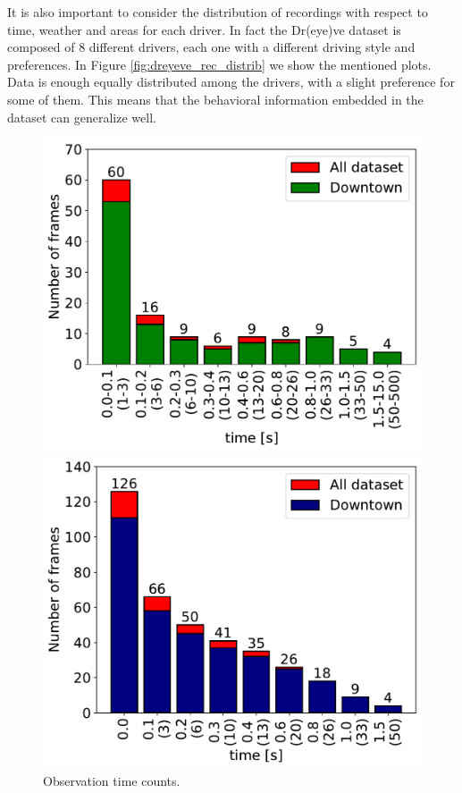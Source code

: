 It is also important to consider the distribution of recordings with respect to 
time, weather and areas for each driver. In fact the Dr(eye)ve dataset is 
composed of 8 different drivers, each one with a different driving style and 
preferences. In Figure \ref{fig:dreyeve_rec_distrib} we 
show the mentioned plots. Data is enough equally distributed among the drivers, 
with a slight preference for some of them. This means that the behavioral 
information embedded in the dataset can generalize well.

\begin{figure}
    \centering
    \begin{minipage}{0.49\textwidth}
        \centering
        \includegraphics[width=\textwidth]{images/dreyeve/tracking_distrib.pdf}
        \caption[Observation time counts.]
        {Observation time counts.}
        \label{fig:tracking_distribution}
    \end{minipage}\hfill
    \begin{minipage}{0.49\textwidth}
        \centering
        \includegraphics[width=\textwidth]{images/dreyeve/tracking_distrib_cum.pdf}

\end{minipage}
\end{figure}
